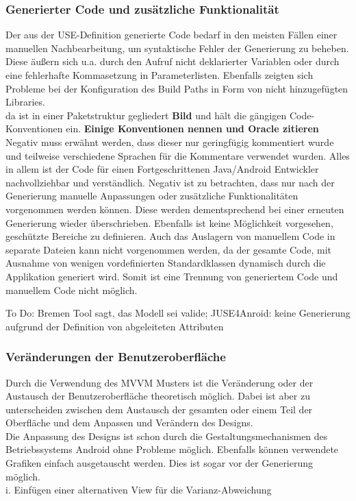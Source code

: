 \documentclass[a4paper,twoside]{article}
\begin{document}
\subsubsection{Generierter Code und zusätzliche Funktionalität}
Der aus der USE-Definition generierte Code bedarf in den meisten Fällen einer manuellen Nachbearbeitung, um syntaktische Fehler der Generierung zu beheben. Diese äußern sich u.a. durch den Aufruf nicht deklarierter Variablen oder durch eine fehlerhafte Kommasetzung in Parameterlisten. 
Ebenfalls zeigten sich Probleme bei der Konfiguration des Build Paths in Form von nicht hinzugefügten Libraries.\\
da  ist in einer Paketstruktur gegliedert \textbf{Bild} und hält die gängigen Code-Konventionen ein. \textbf{Einige Konventionen nennen und Oracle zitieren} Negativ muss erwähnt werden, dass dieser nur geringfügig kommentiert wurde und teilweise verschiedene Sprachen für die Kommentare verwendet wurden. Alles in allem ist der Code für einen Fortgeschrittenen Java/Android Entwickler nachvollziehbar und verständlich. Negativ ist zu betrachten, dass nur nach der Generierung manuelle Anpassungen oder zusätzliche Funktionalitäten vorgenommen werden können. Diese werden dementsprechend bei einer erneuten Generierung wieder überschrieben. Ebenfalls ist keine Möglichkeit vorgesehen, geschützte Bereiche zu definieren. Auch das Auslagern von manuellem Code in separate Dateien kann nicht vorgenommen werden, da der gesamte Code, mit Ausnahme von wenigen vordefinierten Standardklassen dynamisch durch die Applikation generiert wird. Somit ist eine Trennung von generiertem Code und manuellem Code nicht möglich. 

To Do: Bremen Tool sagt, das Modell sei valide; JUSE4Anroid: keine Generierung aufgrund der Definition von abgeleiteten Attributen

\subsubsection{Veränderungen der Benutzeroberfläche}
Durch die Verwendung des MVVM Musters ist die Veränderung oder der Austausch der Benutzeroberfläche theoretisch möglich. Dabei ist aber zu unterscheiden zwischen dem Austausch der gesamten oder einem Teil der Oberfläche und dem Anpassen und Verändern des Designs.\\
Die Anpassung des Designs ist schon durch die Gestaltungsmechanismen des Betriebssystems Android ohne Probleme möglich. Ebenfalls können verwendete Grafiken einfach ausgetauscht werden. Dies ist sogar vor der Generierung möglich.\\
i.	Einfügen einer alternativen View für die Varianz-Abweichung
\end{document}
